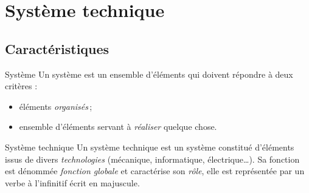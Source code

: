 

\begin{comment}

\documentclass[a4paper, 11pt, twoside, fleqn]{memoir}

\usepackage{AOCDTF}

\marqueurchapitre
\decoupagechapitre{1} %




	\openleft %

\end{comment}

\chapter{Système technique}
\ChapFrame

\section{Caractéristiques}

\begin{definition}{Système}{}
Un système est un ensemble d'éléments qui doivent répondre à deux critères :
\begin{itemize}
\item éléments \emph{organisés}\,;
\item ensemble d'éléments servant à \emph{réaliser} quelque chose.
\end{itemize}
\end{definition}

\begin{definition}{Système technique}{}
Un système technique est un système constitué d'éléments issus de divers \emph{technologies} (mécanique, informatique, électrique\ldots). Sa fonction est dénommée \emph{fonction globale} et caractérise son \emph{rôle}, elle est représentée par un verbe à l'infinitif écrit en majuscule.
\end{definition}

